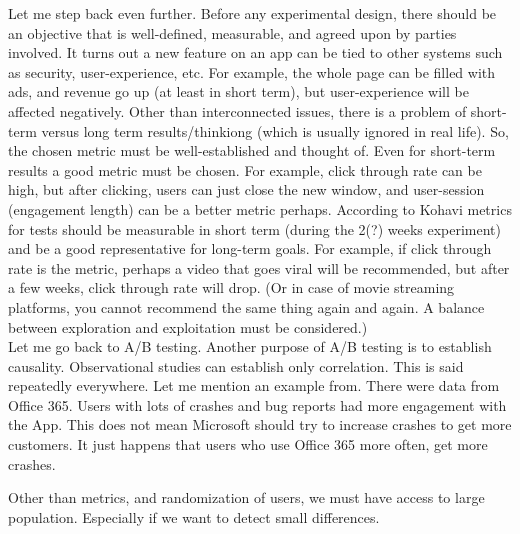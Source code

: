 Let me step back even further. Before any experimental design,
there should be an objective that is well-defined, measurable, and agreed upon
by parties involved. 
It turns out a new feature on an app
can be tied to other systems such as security, user-experience, etc.
For example, the whole page can be filled with ads, and revenue go up (at least in short term),
but user-experience will be affected negatively. 
Other than interconnected issues, there is a problem of short-term versus
long term results/thinkiong (which is usually ignored in real life).
So, the chosen metric must be well-established and thought of.
Even for short-term results a good metric must be chosen.
For example, click through rate can be high, but after clicking,
users can just close the new window, and user-session (engagement length) can be a
better metric perhaps.
According to Kohavi metrics for tests should be measurable in short term (during the 2(?) weeks experiment)
and be a good representative for long-term goals.
For example, if click through rate is the metric, perhaps a video that goes
viral will be recommended, but after a few weeks, click through rate will drop.
(Or in case of movie streaming platforms, you cannot recommend the same thing
again and again. A balance between exploration and exploitation must be considered.)\\

Let me go back to A/B testing.
Another purpose of A/B testing is to establish causality.
Observational studies can establish only correlation.
This is said repeatedly everywhere. Let me mention an
example from\cite{kohavi2020trustworthy}. 
There were data from Office 365. Users with lots of crashes and
bug reports had more engagement with the App. This does not mean
Microsoft should try to increase crashes to get more customers.
It just happens that users who use Office 365 more often, get more crashes.

Other than metrics, and randomization of users, we must have access to large
population. Especially if we want to detect small differences.

